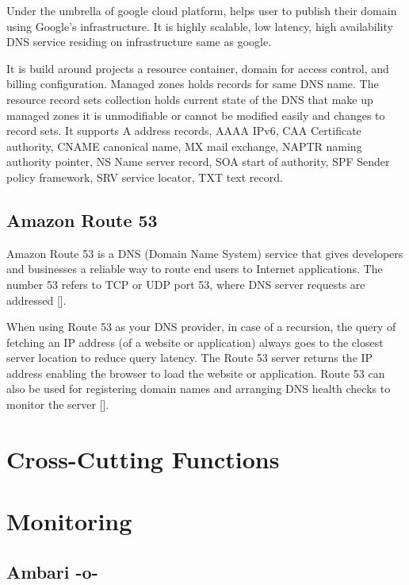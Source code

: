 Under the umbrella of google cloud platform, helps user to publish
their domain using Google's infrastructure. It is highly scalable, low
latency, high availability DNS service residing on infrastructure same
as google.
   
It is build around projects a resource container, domain for access
control, and billing configuration. Managed zones holds records for
same DNS name. The resource record sets collection holds current state
of the DNS that make up managed zones it is unmodifiable or cannot be
modified easily and changes to record sets. It supports A address
records, AAAA IPv6, CAA Certificate authority, CNAME canonical name,
MX mail exchange, NAPTR naming authority pointer, NS Name server
record, SOA start of authority, SPF Sender policy framework, SRV
service locator, TXT text record.




\subsection{Amazon Route 53}

Amazon Route 53 is a DNS (Domain Name System) service that gives
developers and businesses a reliable way to route end users to
Internet applications. The number 53 refers to TCP or UDP port 53,
where DNS server requests are addressed [\cite{www-ar53}].
     
When using Route 53 as your DNS provider, in case of a recursion, the
query of fetching an IP address (of a website or application) always
goes to the closest server location to reduce query latency. The Route
53 server returns the IP address enabling the browser to load the
website or application. Route 53 can also be used for registering
domain names and arranging DNS health checks to monitor the
server [\cite{www-amar53}].

\section{Cross-Cutting Functions}

\section{Monitoring}

\subsection{Ambari -o-}

